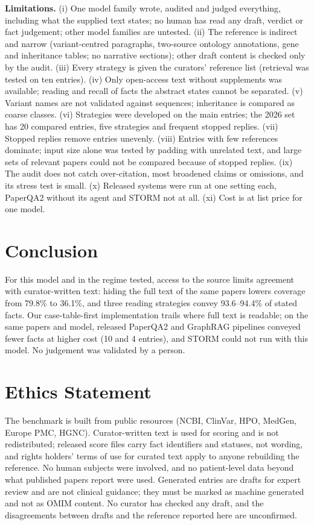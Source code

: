 \documentclass{article} %
\begin{document}
\textbf{Limitations.} (i) One model family wrote, audited and judged everything, including what the supplied text states; no human has read any draft, verdict or fact judgement; other model families are untested. (ii) The reference is indirect and narrow (variant-centred paragraphs, two-source ontology annotations, gene and inheritance tables; no narrative sections); other draft content is checked only by the audit. (iii) Every strategy is given the curators' reference list (retrieval was tested on ten entries). (iv) Only open-access text without supplements was available; reading and recall of facts the abstract states cannot be separated. (v) Variant names are not validated against sequences; inheritance is compared as coarse classes. (vi) Strategies were developed on the main entries; the 2026 set has 20 compared entries, five strategies and frequent stopped replies. (vii) Stopped replies remove entries unevenly. (viii) Entries with few references dominate; input size alone was tested by padding with unrelated text, and large sets of relevant papers could not be compared because of stopped replies. (ix) The audit does not catch over-citation, most broadened claims or omissions, and its stress test is small. (x) Released systems were run at one setting each, PaperQA2 without its agent and STORM not at all. (xi) Cost is at list price for one model.

\section{Conclusion}
\label{sec:conclusion}
For this model and in the regime tested, access to the source limits agreement with curator-written text: hiding the full text of the same papers lowers coverage from 79.8\% to 36.1\%, and three reading strategies convey 93.6--94.4\% of stated facts. Our case-table-first implementation trails where full text is readable; on the same papers and model, released PaperQA2 and GraphRAG pipelines conveyed fewer facts at higher cost (10 and 4 entries), and STORM could not run with this model. No judgement was validated by a person.

\section*{Ethics Statement}
The benchmark is built from public resources (NCBI, ClinVar, HPO, MedGen, Europe PMC, HGNC). Curator-written text is used for scoring and is not redistributed; released score files carry fact identifiers and statuses, not wording, and rights holders' terms of use for curated text apply to anyone rebuilding the reference. No human subjects were involved, and no patient-level data beyond what published papers report were used. Generated entries are drafts for expert review and are not clinical guidance; they must be marked as machine generated and not as OMIM content. No curator has checked any draft, and the disagreements between drafts and the reference reported here are unconfirmed.
\end{document}
